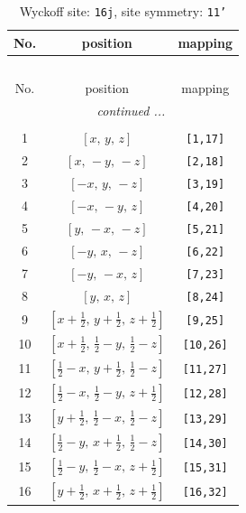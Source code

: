 \documentclass[fleqn,8pt]{jsarticle}
\begin{document}
\begin{longtable}{ccc}
\caption{Wyckoff site: {\tt 16j}, site symmetry: {\tt 11'}}
 \\
 \hline \hline
No. & position & mapping \\ \hline \endfirsthead

\multicolumn{2}{l}{\tablename\ \thetable{}} \\
 \hline \hline
No. & position & mapping \\ \hline \endhead

 \hline \hline
\multicolumn{2}{r}{\footnotesize\it continued ...} \\ \endfoot

 \hline \hline
\multicolumn{2}{r}{} \\ \endlastfoot

1 & $\left[ x,\, y,\, z \right]$ & {\tt [1,17]} \\ \hline
2 & $\left[ x,\, - y,\, - z \right]$ & {\tt [2,18]} \\ \hline
3 & $\left[ - x,\, y,\, - z \right]$ & {\tt [3,19]} \\ \hline
4 & $\left[ - x,\, - y,\, z \right]$ & {\tt [4,20]} \\ \hline
5 & $\left[ y,\, - x,\, - z \right]$ & {\tt [5,21]} \\ \hline
6 & $\left[ - y,\, x,\, - z \right]$ & {\tt [6,22]} \\ \hline
7 & $\left[ - y,\, - x,\, z \right]$ & {\tt [7,23]} \\ \hline
8 & $\left[ y,\, x,\, z \right]$ & {\tt [8,24]} \\ \hline
9 & $\left[ x + \frac{1}{2},\, y + \frac{1}{2},\, z + \frac{1}{2} \right]$ & {\tt [9,25]} \\ \hline
10 & $\left[ x + \frac{1}{2},\, \frac{1}{2} - y,\, \frac{1}{2} - z \right]$ & {\tt [10,26]} \\ \hline
11 & $\left[ \frac{1}{2} - x,\, y + \frac{1}{2},\, \frac{1}{2} - z \right]$ & {\tt [11,27]} \\ \hline
12 & $\left[ \frac{1}{2} - x,\, \frac{1}{2} - y,\, z + \frac{1}{2} \right]$ & {\tt [12,28]} \\ \hline
13 & $\left[ y + \frac{1}{2},\, \frac{1}{2} - x,\, \frac{1}{2} - z \right]$ & {\tt [13,29]} \\ \hline
14 & $\left[ \frac{1}{2} - y,\, x + \frac{1}{2},\, \frac{1}{2} - z \right]$ & {\tt [14,30]} \\ \hline
15 & $\left[ \frac{1}{2} - y,\, \frac{1}{2} - x,\, z + \frac{1}{2} \right]$ & {\tt [15,31]} \\ \hline
16 & $\left[ y + \frac{1}{2},\, x + \frac{1}{2},\, z + \frac{1}{2} \right]$ & {\tt [16,32]} \\
\end{longtable}
\end{document}
